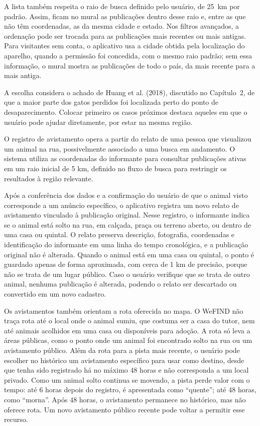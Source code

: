 A lista também respeita o raio de busca definido pelo usuário, de 25~km por padrão. Assim, ficam no mural as publicações dentro desse raio e, entre as que não têm coordenadas, as da mesma cidade e estado. Nos filtros avançados, a ordenação pode ser trocada para as publicações mais recentes ou mais antigas. Para visitantes sem conta, o aplicativo usa a cidade obtida pela localização do aparelho, quando a permissão foi concedida, com o mesmo raio padrão; sem essa informação, o mural mostra as publicações de todo o país, da mais recente para a mais antiga.

A escolha considera o achado de Huang et al. (2018), discutido no Capítulo~2, de que a maior parte dos gatos perdidos foi localizada perto do ponto de desaparecimento. Colocar primeiro os casos próximos destaca aqueles em que o usuário pode ajudar diretamente, por estar na mesma região.


O registro de avistamento opera a partir do relato de uma pessoa que visualizou um animal na rua, possivelmente associado a uma busca em andamento. O sistema utiliza as coordenadas do informante para consultar publicações ativas em um raio inicial de 5 km, definido no fluxo de busca para restringir os resultados à região relevante.

Após a conferência dos dados e a confirmação do usuário de que o animal visto corresponde a um anúncio específico, o aplicativo registra um novo relato de avistamento vinculado à publicação original. Nesse registro, o informante indica se o animal está solto na rua, em calçada, praça ou terreno aberto, ou dentro de uma casa ou quintal. O relato preserva descrição, fotografia, coordenadas e identificação do informante em uma linha do tempo cronológica, e a publicação original não é alterada. Quando o animal está em uma casa ou quintal, o ponto é guardado apenas de forma aproximada, com cerca de 1 km de precisão, porque não se trata de um lugar público. Caso o usuário verifique que se trata de outro animal, nenhuma publicação é alterada, podendo o relato ser descartado ou convertido em um novo cadastro.

Os avistamentos também orientam a rota oferecida no mapa. O WeFIND não traça rota até o local onde o animal sumiu, que costuma ser a casa do tutor, nem até animais acolhidos em uma casa ou disponíveis para adoção. A rota só leva a áreas públicas, como o ponto onde um animal foi encontrado solto na rua ou um avistamento público. Além da rota para a pista mais recente, o usuário pode escolher no histórico um avistamento específico para usar como destino, desde que tenha sido registrado há no máximo 48 horas e não corresponda a um local privado. Como um animal solto continua se movendo, a pista perde valor com o tempo: até 6 horas depois do registro, é apresentada como ``quente''; até 48 horas, como ``morna''. Após 48 horas, o avistamento permanece no histórico, mas não oferece rota. Um novo avistamento público recente pode voltar a permitir esse recurso.

